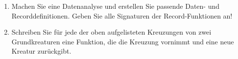 \begin{aufgabe}
  \begin{enumerate}

  \item Machen Sie eine Datenanalyse und erstellen
    Sie passende Daten- und Recorddefinitionen.  Geben Sie alle
    Signaturen der Record-Funktionen an!

  \item Schreiben Sie für jede der oben aufgelisteten
    Kreuzungen von zwei Grundkreaturen eine Funktion, die die Kreuzung
    vornimmt und eine neue Kreatur zurückgibt.
  \end{enumerate}
\end{aufgabe}


